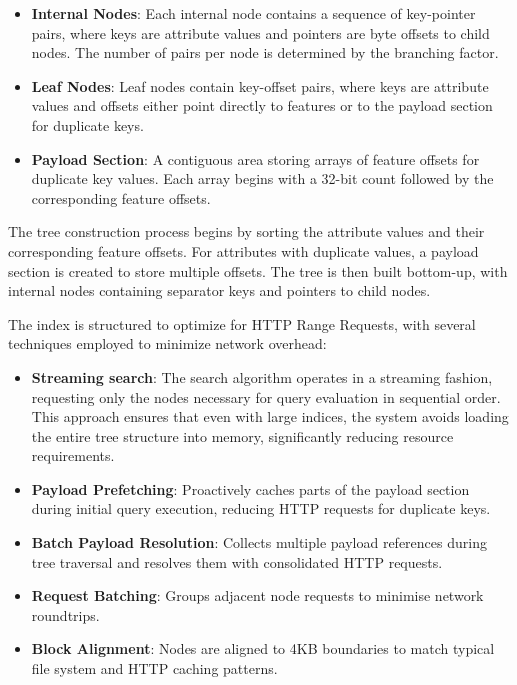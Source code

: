 \begin{itemize}
    \item \textbf{Internal Nodes}: Each internal node contains a sequence of key-pointer pairs, where keys are attribute values and pointers are byte offsets to child nodes. The number of pairs per node is determined by the branching factor.
    
    \item \textbf{Leaf Nodes}: Leaf nodes contain key-offset pairs, where keys are attribute values and offsets either point directly to features or to the payload section for duplicate keys.
    
    \item \textbf{Payload Section}: A contiguous area storing arrays of feature offsets for duplicate key values. Each array begins with a 32-bit count followed by the corresponding feature offsets.
\end{itemize}

The tree construction process begins by sorting the attribute values and their corresponding feature offsets. For attributes with duplicate values, a payload section is created to store multiple offsets. The tree is then built bottom-up, with internal nodes containing separator keys and pointers to child nodes.

The index is structured to optimize for HTTP Range Requests, with several techniques employed to minimize network overhead:

\begin{itemize}
    \item \textbf{Streaming search}: The search algorithm operates in a streaming fashion, requesting only the nodes necessary for query evaluation in sequential order. This approach ensures that even with large indices, the system avoids loading the entire tree structure into memory, significantly reducing resource requirements.
    \item \textbf{Payload Prefetching}: Proactively caches parts of the payload section during initial query execution, reducing HTTP requests for duplicate keys.
    \item \textbf{Batch Payload Resolution}: Collects multiple payload references during tree traversal and resolves them with consolidated HTTP requests.
    \item \textbf{Request Batching}: Groups adjacent node requests to minimise network roundtrips.
    \item \textbf{Block Alignment}: Nodes are aligned to 4KB boundaries to match typical file system and HTTP caching patterns.
\end{itemize}

